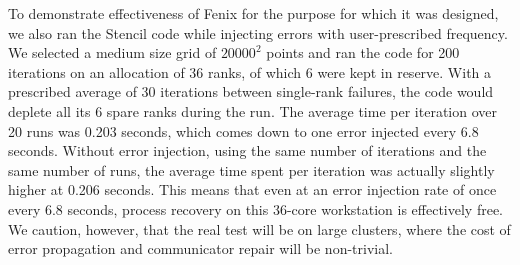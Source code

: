 To demonstrate effectiveness of Fenix for the purpose for which it was designed,
we also ran the Stencil code while injecting errors with user-prescribed
frequency.
We selected a medium size grid of $20000^2$ points and ran the code for 200
iterations on an allocation of 36 ranks, of which 6 were kept in reserve.
With a prescribed average of 30 iterations between single-rank failures, the
code would deplete all its 6 spare ranks during the run.
The average time per iteration over 20 runs was 0.203 seconds, which comes
down to one error injected every 6.8 seconds.
Without error injection, using the same number of iterations and the same
number of runs, the average time spent per iteration was actually slightly
higher at 0.206 seconds.
This means that even at an error injection rate of once every 6.8 seconds,
process recovery on this 36-core workstation is effectively free.
We caution, however, that the real test will be on large clusters,
where the cost of error propagation and communicator repair will be non-trivial.
